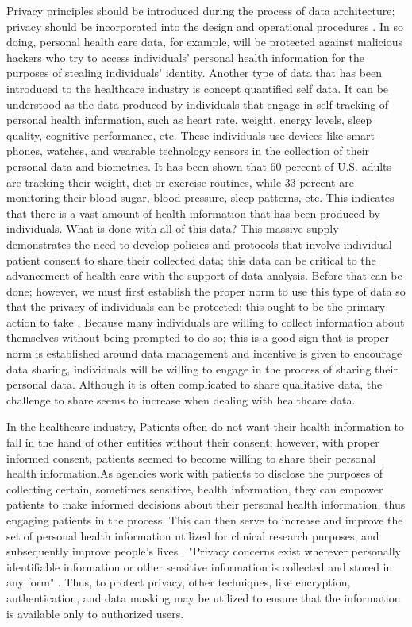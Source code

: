 \documentclass[sigconf]{acmart}
\begin{document}
Privacy principles should be introduced during the process of data architecture; privacy should be incorporated into the design and operational procedures \cite{cavoukian2012privacy}. In so doing, personal health care data, for example, will be protected against malicious hackers who try to access individuals' personal health information for the purposes of stealing individuals' identity. Another type of data that has been introduced to the healthcare industry is concept quantified self data. It can be understood as the data produced by individuals that engage in self-tracking of personal health information, such as heart rate, weight, energy levels, sleep quality, cognitive performance, etc. These individuals use devices like smart-phones, watches, and wearable technology sensors in the collection of their personal data and biometrics. It has been shown that 60 percent of U.S. adults are tracking their weight, diet or exercise routines, while 33 percent are monitoring their blood sugar, blood pressure, sleep patterns, etc. This indicates that there is a vast amount of health information that has been produced by individuals. What is done with all of this data? This massive supply demonstrates the need to develop policies and protocols that involve individual patient consent to share their collected data; this data can be critical to the advancement of health-care with the support of data analysis. Before that can be done; however, we must first establish the proper norm to use this type of data so that the privacy of individuals can be protected; this ought to be the primary action to take \cite{swan2013quantified}. Because many individuals are willing to collect information about themselves without being prompted to do so; this is a good sign that is proper norm is established around data management and incentive is given to encourage data sharing, individuals will be willing to engage in the process of sharing their personal data. Although it is often complicated to share qualitative data, the challenge to share seems to increase when dealing with healthcare data. 

In the healthcare industry, Patients often do not want their health information to fall in the hand of other entities without their consent; however, with proper informed consent, patients seemed to become willing to share their personal health information.As agencies work with patients to disclose the purposes of collecting certain, sometimes sensitive, health information, they can empower patients to make informed decisions about their personal health information, thus engaging patients in the process. This can then serve to increase and improve the set of personal health information utilized for clinical research purposes, and subsequently improve people's lives \cite{shelton2011electronic}. 
"Privacy concerns exist wherever personally identifiable information or other sensitive information is collected and stored in any form" \cite{khan2016digital}. Thus, to protect privacy, other techniques, like encryption, authentication, and data masking may be utilized to ensure that the information is available only to authorized users.
\end{document}
